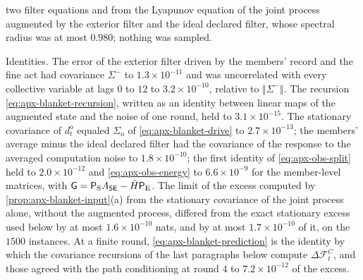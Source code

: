 \begin{numcheck}
two filter equations and from the Lyapunov equation of the joint process augmented by the exterior filter and the ideal declared filter, whose spectral radius was at most $0.980$; nothing was sampled.

Identities. The error of the exterior filter driven by the members' record and the fine act had covariance $\Sigma^-$ to $1.3\times10^{-11}$ and was uncorrelated with every collective variable at lags $0$ to $12$ to $3.2\times10^{-10}$, relative to $\Vert\Sigma^-\Vert$. The recursion \eqref{eq:apx-blanket-recursion}, written as an identity between linear maps of the augmented state and the noise of one round, held to $3.1\times10^{-15}$. The stationary covariance of $d^{\mathrm o}_t$ equaled $\Sigma_{\mathrm o}$ of \eqref{eq:apx-blanket-drive} to $2.7\times10^{-13}$; the members' average minus the ideal declared filter had the covariance of the response to the averaged computation noise to $1.8\times10^{-10}$; the first identity of \eqref{eq:apx-obs-split} held to $2.0\times10^{-12}$ and \eqref{eq:apx-obs-energy} to $6.6\times10^{-9}$ for the member-level matrices, with $\mathsf G=\mathsf P_{\mathrm S}A_{\mathsf{S}\mathsf{E}}-\bar H\mathsf P_{\mathrm E}$. The limit of the excess computed by \cref{prop:apx-blanket-input}(a) from the stationary covariance of the joint process alone, without the augmented process, differed from the exact stationary excess used below by at most $1.6\times10^{-10}$ nats, and by at most $1.7\times10^{-10}$ of it, on the $1500$ instances. At a finite round, \eqref{eq:apx-blanket-prediction} is the identity by which the covariance recursions of the last paragraphs below compute $\Delta\mathcal F^C_t$, and those agreed with the path conditioning at round $4$ to $7.2\times10^{-12}$ of the excess.


\end{numcheck}
